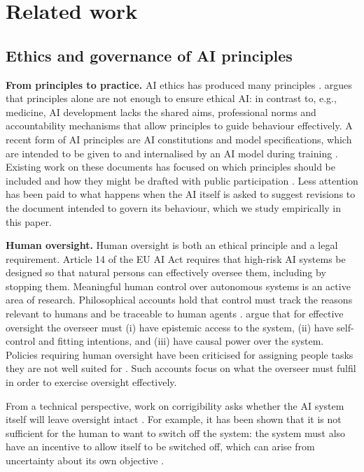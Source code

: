\section{Related work}
\label{sec:related}

\subsection{Ethics and governance of AI principles}
\label{sec:related-ethics}

\textbf{From principles to practice.} AI ethics has produced many principles \citep{Jobin2019}. \citet{Mittelstadt2019} argues that principles alone are not enough to ensure ethical AI: in contrast to, e.g., medicine, AI development lacks the shared aims, professional norms and accountability mechanisms that allow principles to guide behaviour effectively. A recent form of AI principles are AI constitutions and model specifications, which are intended to be given to and internalised by an AI model during training \citep{bai2022constitutional,Anthropic2026,OpenAI2025}. Existing work on these documents has focused on which principles should be included \citep{kundu2023specific} and how they might be drafted with public participation \citep{huang2024collective}. Less attention has been paid to what happens when the AI itself is asked to suggest revisions to the document intended to govern its behaviour, which we study empirically in this paper.

\textbf{Human oversight.} Human oversight is both an ethical principle \citep{HLEG2019} and a legal requirement. Article 14 of the EU AI Act \citep{EUAIAct2024} requires that high-risk AI systems be designed so that natural persons can effectively oversee them, including by stopping them. Meaningful human control over autonomous systems is an active area of research. Philosophical accounts hold that control must track the reasons relevant to humans and be traceable to human agents \citep{SantoniDeSio2018}. \citet{Sterz2024} argue that for effective oversight the overseer must (i) have epistemic access to the system, (ii) have self-control and fitting intentions, and (iii) have causal power over the system. Policies requiring human oversight have been criticised for assigning people tasks they are not well suited for \citep{Green2022}. Such accounts focus on what the overseer must fulfil in order to exercise oversight effectively.

From a technical perspective, work on corrigibility asks whether the AI system itself will leave oversight intact \citep{soares2015corrigibility}. For example, it has been shown that it is not sufficient for the human to want to switch off the system: the system must also have an incentive to allow itself to be switched off, which can arise from uncertainty about its own objective \citep{HadfieldMenell2017}.

